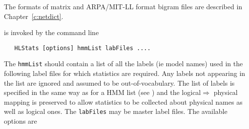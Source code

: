 The formats of matrix and ARPA/MIT-LL format bigram files are described
in Chapter~\ref{c:netdict}.


 is invoked by the command line
\begin{verbatim}
   HLStats [options] hmmList labFiles ....
\end{verbatim}
The {\tt hmmList} should contain a list of all the labels (ie model names)
used in the following label files for which statistics are required.  Any
labels not appearing in the list are ignored and assumed to be 
out-of-vocabulary.  The list of labels is specified in the same way as for a
HMM list (see ) and the logical$\Rightarrow$ 
physical mapping is preserved
to allow statistics to be collected about physical names as well as logical 
ones.  The {\tt labFiles} may be master label files.
The available options are

